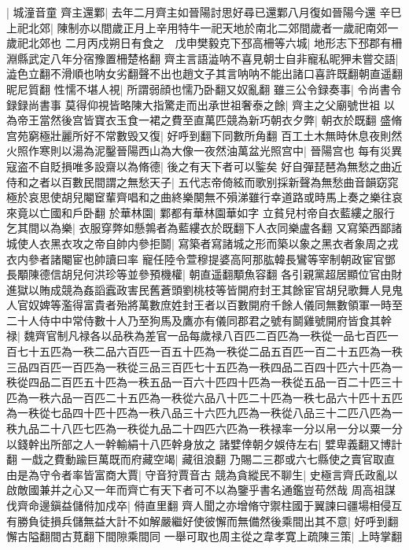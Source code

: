 |{
	城潼音童}
齊主還鄴|{
	去年二月齊主如晉陽討思好尋已還鄴八月復如晉陽今還}
辛巳上祀北郊|{
	陳制亦以間歲正月上辛用特牛一祀天地於南北二郊間歲者一歲祀南郊一歲祀北郊也}
二月丙戍朔日有食之　戊申樊毅克下邳高柵等六城|{
	地形志下邳郡有柵淵縣武定八年分宿豫置柵楚格翻}
齊主言語澁呐不喜見朝士自非寵私昵狎未嘗交語|{
	澁色立翻不滑順也呐女劣翻聲不出也趙文子其言呐呐不能出諸口喜許既翻朝直遥翻昵尼質翻}
性懦不堪人視|{
	所謂弱顔也懦乃卧翻又奴亂翻}
雖三公令録奏事|{
	令尚書令録録尚書事}
莫得仰視皆略陳大指驚走而出承世祖奢泰之餘|{
	齊主之父廟號世祖}
以為帝王當然後宫皆寶衣玉食一裙之費至直萬匹競為新巧朝衣夕弊|{
	朝衣於既翻}
盛脩宫苑窮極壯麗所好不常數毁又復|{
	好呼到翻下同數所角翻}
百工土木無時休息夜則然火照作寒則以湯為泥鑿晉陽西山為大像一夜然油萬盆光照宫中|{
	晉陽宫也}
每有災異寇盗不自貶損唯多設齋以為脩德|{
	後之有天下者可以鍳矣}
好自彈琵琶為無愁之曲近侍和之者以百數民間謂之無愁天子|{
	五代志帝倚絃而歌别採新聲為無愁曲音韻窈窕極於哀思使胡兒閹䆠輩齊唱和之曲終樂闋無不殞涕雖行幸道路或時馬上奏之樂往哀來竟以亡國和戶卧翻}
於華林園|{
	鄴都有華林園華如字}
立貧兒村帝自衣藍縷之服行乞其間以為樂|{
	衣服穿弊如懸鶉者為藍縷衣於既翻下人衣同樂盧各翻}
又寫築西鄙諸城使人衣黑衣攻之帝自帥内參拒鬬|{
	寫築者寫諸城之形而築以象之黑衣者象周之戎衣内參者諸閹宦也帥讀曰率}
寵任陸令萱穆提婆高阿那肱韓長鸞等宰制朝政宦官鄧長顒陳德信胡兒何洪珍等並參預機權|{
	朝直遥翻顒魚容翻}
各引親黨超居顯位官由財進獄以賄成競為姦謟蠧政害民舊蒼頭劉桃枝等皆開府封王其餘宦官胡兒歌舞人見鬼人官奴婢等濫得富貴者殆將萬數庶姓封王者以百數開府千餘人儀同無數領軍一時至二十人侍中中常侍數十人乃至狗馬及鷹亦有儀同郡君之號有鬬雞號開府皆食其幹禄|{
	魏齊官制凡禄各以品秩為差官一品每歲禄八百匹二百匹為一秩從一品七百匹一百七十五匹為一秩二品六百匹一百五十匹為一秩從二品五百匹一百二十五匹為一秩三品四百匹一百匹為一秩從三品三百匹七十五匹為一秩四品二百四十匹六十匹為一秩從四品二百匹五十匹為一秩五品一百六十匹四十匹為一秩從五品一百二十匹三十匹為一秩六品一百匹二十五匹為一秩從六品八十匹二十匹為一秩七品六十匹十五匹為一秩從七品四十匹十匹為一秩八品三十六匹九匹為一秩從八品三十二匹八匹為一秩九品二十八匹七匹為一秩從九品二十四匹六匹為一秩禄率一分以帛一分以粟一分以錢幹出所部之人一幹輸絹十八匹幹身放之}
諸嬖倖朝夕娛侍左右|{
	嬖卑義翻又博計翻}
一戱之費動踰巨萬既而府藏空竭|{
	藏徂浪翻}
乃賜二三郡或六七縣使之賣官取直由是為守令者率皆富商大賈|{
	守音狩賈音古}
競為貪縱民不聊生|{
	史極言齊氏政亂以啟敵國兼并之心又一年而齊亡有天下者可不以為鑒乎書名通鑑豈苟然哉}
周高祖謀伐齊命邊鎭益儲偫加戍卒|{
	偫直里翻}
齊人聞之亦增脩守禦柱國于翼諫曰疆場相侵互有勝負徒損兵儲無益大計不如解嚴繼好使彼懈而無備然後乘間出其不意|{
	好呼到翻懈古隘翻間古莧翻下間隙乘間同}
一舉可取也周主從之韋孝寛上疏陳三策|{
	上時掌翻}
